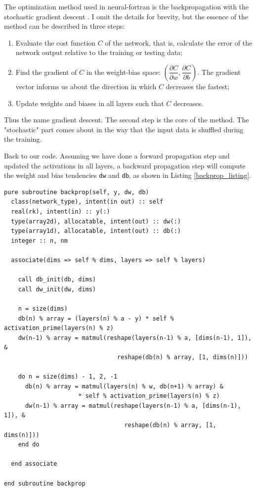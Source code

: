 \documentclass[sigplan, review=false, screen=true, balance=true]{acmart}
\begin{document}
The optimization method used in neural-fortran is the backpropagation with the
stochastic gradient descent \citep{rumelhart86}. I omit the details for brevity,
but the essence of the method can be described in three steps:

\begin{enumerate}
  \item Evaluate the cost function $C$ of the network, that is, calculate the error
  of the network output relative to the training or testing data;
  \item Find the gradient of $C$ in the weight-bias space: $\left( \dfrac{\partial C}{\partial w}, \dfrac{\partial C}{\partial b} \right)$. The gradient vector informs us about
  the direction in which $C$ decreases the fastest;
  \item Update weights and biases in all layers such that $C$ decreases.
\end{enumerate}

Thus the name gradient descent. The second step is the core of the method.
The "stochastic" part comes about in the way that the input data is 
shuffled during the training.

Back to our code. Assuming we have done a forward propagation step and updated
the activations in all layers, a backward propagation step will compute
the weight and bias tendencies \lstinline{dw} and \lstinline{db}, as shown in
Listing \ref{backprop_listing}.

\begin{lstlisting}[caption={A subroutine to perform the backpropagation using gradient descent, and return the weight and bias tendencies.}, captionpos=b, float=*h, label={backprop_listing}]
pure subroutine backprop(self, y, dw, db)
  class(network_type), intent(in out) :: self
  real(rk), intent(in) :: y(:)
  type(array2d), allocatable, intent(out) :: dw(:)
  type(array1d), allocatable, intent(out) :: db(:)
  integer :: n, nm

  associate(dims => self % dims, layers => self % layers)

    call db_init(db, dims)
    call dw_init(dw, dims)

    n = size(dims)
    db(n) % array = (layers(n) % a - y) * self % activation_prime(layers(n) % z)
    dw(n-1) % array = matmul(reshape(layers(n-1) % a, [dims(n-1), 1]), &
                                reshape(db(n) % array, [1, dims(n)]))

    do n = size(dims) - 1, 2, -1
      db(n) % array = matmul(layers(n) % w, db(n+1) % array) &
                     * self % activation_prime(layers(n) % z)
      dw(n-1) % array = matmul(reshape(layers(n-1) % a, [dims(n-1), 1]), &
                                  reshape(db(n) % array, [1, dims(n)]))
    end do

  end associate

end subroutine backprop
\end{lstlisting}
\end{document}
